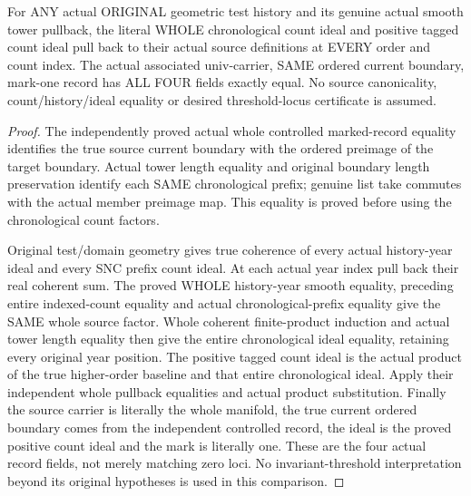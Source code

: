 \begin{theorem}
\label{hir:original-coherent-any-test-chronological-positive-count-smooth-pullback}
\leanok
For ANY actual ORIGINAL geometric test history and its genuine actual
smooth tower pullback, the literal WHOLE chronological count ideal and
positive tagged count ideal pull back to their actual source definitions
at EVERY order and count index. The actual associated univ-carrier,
SAME ordered current boundary, mark-one record has ALL FOUR fields exactly
equal. No source canonicality, count/history/ideal equality or desired
threshold-locus certificate is assumed.
\end{theorem}
\begin{proof}
The independently proved actual whole controlled marked-record equality
identifies the true source current boundary with the ordered preimage of
the target boundary. Actual tower length equality and original boundary
length preservation identify each SAME chronological prefix; genuine
list take commutes with the actual member preimage map. This equality is
proved before using the chronological count factors.

Original test/domain geometry gives true coherence of every actual
history-year ideal and every SNC prefix count ideal. At each actual year
index pull back their real coherent sum. The proved WHOLE history-year
smooth equality, preceding entire indexed-count equality and actual
chronological-prefix equality give the SAME whole source factor. Whole
coherent finite-product induction and actual tower length equality then
give the entire chronological ideal equality, retaining every original
year position. The positive tagged count ideal is the actual product of
the true higher-order baseline and that entire chronological ideal.
Apply their independent whole pullback equalities and actual product
substitution. Finally the source carrier is literally the whole manifold,
the true current ordered boundary comes from the independent controlled
record, the ideal is the proved positive count ideal and the mark is
literally one. These are the four actual record fields, not merely
matching zero loci. No invariant-threshold interpretation beyond its
original hypotheses is used in this comparison.
\end{proof}

